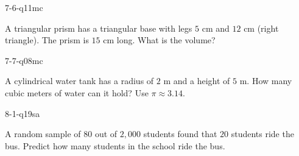 \begin{practiceQuestion}{7-6-q11}{mc}
\begin{questionText}
A triangular prism has a triangular base with legs $5$ cm and $12$ cm (right triangle). The prism is $15$ cm long. What is the volume?
\end{questionText}
\end{practiceQuestion}

\begin{practiceQuestion}{7-7-q08}{mc}
\begin{questionText}
A cylindrical water tank has a radius of $2$ m and a height of $5$ m. How many cubic meters of water can it hold? Use $\pi \approx 3.14$.
\end{questionText}
\end{practiceQuestion}

\begin{practiceQuestion}{8-1-q19}{sa}
\begin{questionText}
A random sample of $80$ out of $2{,}000$ students found that $20$ students ride the bus. Predict how many students in the school ride the bus.
\end{questionText}
\end{practiceQuestion}

